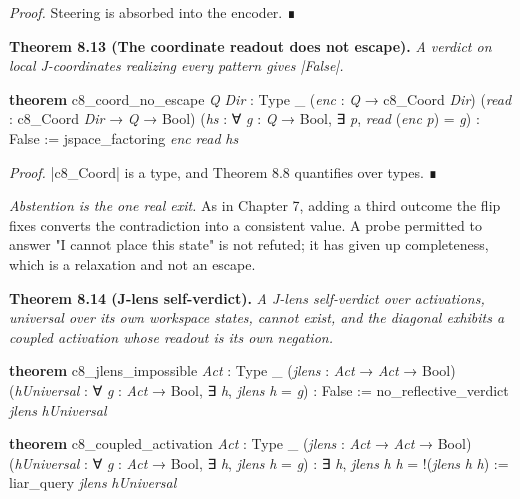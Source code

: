 \documentclass{memoir}
\begin{document}
\emph{Proof.} Steering is absorbed into the encoder. ∎

\textbf{Theorem 8.13 (The coordinate readout does not escape).} \emph{A verdict on local
J-coordinates realizing every pattern gives \LeanVerb|False|.}

\begin{LeanVerbatim}
\textbf{theorem} c8_coord_no_escape \textit{Q} \textit{Dir} : Type _
    (\textit{enc} : \textit{Q} → c8_Coord \textit{Dir})
    (\textit{read} : c8_Coord \textit{Dir} → \textit{Q} → Bool)
    (\textit{hs} : ∀ \textit{g} : \textit{Q} → Bool, ∃ \textit{p}, \textit{read} (\textit{enc} \textit{p}) = \textit{g}) :
    False :=
  jspace_factoring \textit{enc} \textit{read} \textit{hs}

\end{LeanVerbatim}


\emph{Proof.} \LeanVerb|c8_Coord| is a type, and Theorem 8.8 quantifies over types. ∎

\emph{Abstention is the one real exit.} As in Chapter 7, adding a third outcome the
flip fixes converts the contradiction into a consistent value. A probe permitted
to answer "I cannot place this state" is not refuted; it has given up
completeness, which is a relaxation and not an escape.

\textbf{Theorem 8.14 (J-lens self-verdict).} \emph{A J-lens self-verdict over activations,
universal over its own workspace states, cannot exist, and the diagonal exhibits
a coupled activation whose readout is its own negation.}

\begin{LeanVerbatim}
\textbf{theorem} c8_jlens_impossible \textit{Act} : Type _
    (\textit{jlens} : \textit{Act} → \textit{Act} → Bool)
    (\textit{hUniversal} : ∀ \textit{g} : \textit{Act} → Bool, ∃ \textit{h}, \textit{jlens} \textit{h} = \textit{g}) :
    False :=
  no_reflective_verdict \textit{jlens} \textit{hUniversal}

\textbf{theorem} c8_coupled_activation \textit{Act} : Type _
    (\textit{jlens} : \textit{Act} → \textit{Act} → Bool)
    (\textit{hUniversal} : ∀ \textit{g} : \textit{Act} → Bool, ∃ \textit{h}, \textit{jlens} \textit{h} = \textit{g}) :
    ∃ \textit{h}, \textit{jlens} \textit{h} \textit{h} = !(\textit{jlens} \textit{h} \textit{h}) :=
  liar_query \textit{jlens} \textit{hUniversal}

\end{LeanVerbatim}
\end{document}
